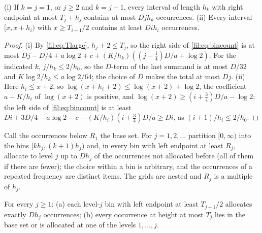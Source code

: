 \begin{lemma}\label{fil:lem:capacity}
\textup{(i)} If $k=j=1$, or $j\ge2$ and $k=j-1$, every interval of length $h_k$ with right endpoint at most
$T_j+h_j$ contains at most $Djh_k$ occurrences. \textup{(ii)} Every interval $[x,x+h_i)$ with
$x\ge T_{i+1}/2$ contains at least $Dih_i$ occurrences.
\end{lemma}

\begin{proof}
(i) By \eqref{fil:eq:Tlarge}, $h_j+2\le T_j$, so the right side of \eqref{fil:eq:bincount} is at most
$Dj-D/4+a\log2+c+(K/h_k)((j-\tfrac14)D/a+\log2)$. For the indicated $k$, $j/h_k\le2/h_0$, so the $D$-term of
the last summand is at most $D/32$ and $K\log2/h_k\le a\log2/64$; the choice of $D$ makes the total at most
$Dj$. (ii) Here $h_i\le x+2$, so $\log(x+h_i+2)\le\log(x+2)+\log2$, the coefficient $a-K/h_i$ of
$\log(x+2)$ is positive, and $\log(x+2)\ge(i+\tfrac34)D/a-\log2$; the left side of \eqref{fil:eq:bincount} is at
least $Di+3D/4-a\log2-c-(K/h_i)(i+\tfrac34)D/a\ge Di$, as $(i+1)/h_i\le2/h_0$.
\end{proof}

Call the occurrences below $R_1$ the base set. For $j=1,2,\dots$ partition $[0,\infty)$ into the bins
$[kh_j,(k+1)h_j)$ and, in every bin with left endpoint at least $R_j$, allocate to level $j$ up to $Dh_j$ of
the occurrences not allocated before (all of them if there are fewer); the choice within a bin is arbitrary,
and the occurrences of a repeated frequency are distinct items. The grids are nested and $R_j$ is a multiple
of $h_j$.

\begin{lemma}\label{fil:lem:allocate}
For every $j\ge1$: \textup{(a)} each level-$j$ bin with left endpoint at least $T_{j+1}/2$ allocates exactly
$Dh_j$ occurrences; \textup{(b)} every occurrence at height at most $T_j$ lies in the base set or is allocated
at one of the levels $1,\dots,j$.
\end{lemma}

